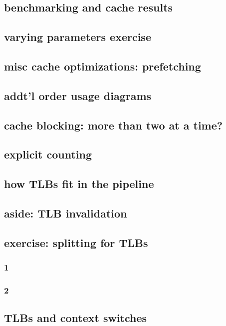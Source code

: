 \subsection{benchmarking and cache results}



\subsection{varying parameters exercise}


\subsection{misc cache optimizations: prefetching}



\subsection{addt'l order usage diagrams}

\subsection{cache blocking: more than two at a time?}

%


\subsection{explicit counting}


\subsection{how TLBs fit in the pipeline}


\subsection{aside: TLB invalidation}


\subsection{exercise: splitting for TLBs}
\subsubsection{1}

\subsubsection{2}




\subsection{TLBs and context switches}


